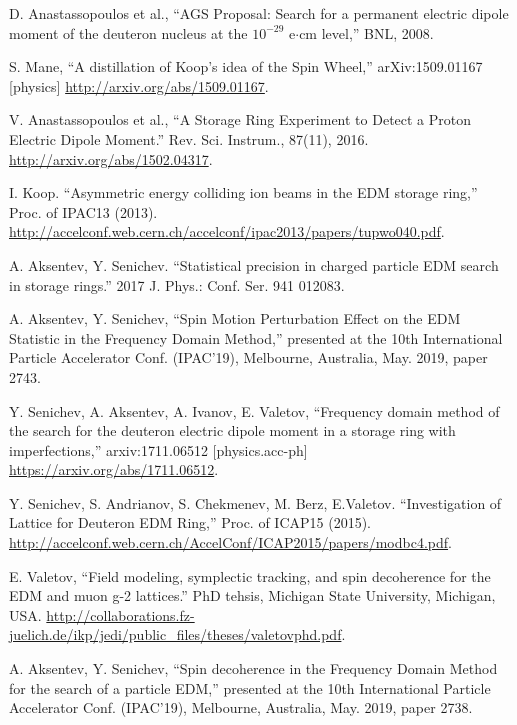 \documentclass[a4paper]{jacow}
\begin{document}
\begin{thebibliography}{9}
  
  D. Anastassopoulos et al., ``AGS Proposal: Search for a permanent electric dipole moment of
  the deuteron nucleus at the $10^{-29}$ e$\cdot$cm level,'' BNL, 2008.

  S. Mane, ``A distillation of Koop's idea of the Spin Wheel,'' arXiv:1509.01167 [physics]
  \url{http://arxiv.org/abs/1509.01167}.

  V. Anastassopoulos et al., ``A Storage Ring Experiment to Detect a Proton Electric Dipole Moment.''
  Rev. Sci. Instrum., 87(11), 2016.
  \url{http://arxiv.org/abs/1502.04317}.

  I. Koop. ``Asymmetric energy colliding ion beams in the EDM storage ring,'' Proc. of IPAC13 (2013).
  \url{http://accelconf.web.cern.ch/accelconf/ipac2013/papers/tupwo040.pdf}.

  A. Aksentev, Y. Senichev. ``Statistical precision in charged particle EDM search in storage rings.''
  2017 J. Phys.: Conf. Ser. 941 012083.

  A. Aksentev, Y. Senichev, ``Spin Motion Perturbation Effect on the EDM Statistic
  in the Frequency Domain Method,'' presented at the 10th International Particle Accelerator Conf. (IPAC'19),
  Melbourne, Australia, May. 2019, paper 2743.

  Y. Senichev, A. Aksentev, A. Ivanov, E. Valetov, ``Frequency domain method of the search for
  the deuteron electric dipole moment in a storage ring with imperfections,'' arxiv:1711.06512 [physics.acc-ph]
  \url{https://arxiv.org/abs/1711.06512}.

  Y. Senichev, S. Andrianov, S. Chekmenev, M. Berz, E.Valetov. ``Investigation of Lattice for Deuteron EDM Ring,''
  Proc. of ICAP15 (2015). \url{http://accelconf.web.cern.ch/AccelConf/ICAP2015/papers/modbc4.pdf}.

  E. Valetov, ``Field modeling, symplectic tracking, and spin decoherence for the EDM and muon g-2 lattices.''
  PhD tehsis, Michigan State University, Michigan, USA.
  \url{http://collaborations.fz-juelich.de/ikp/jedi/public_files/theses/valetovphd.pdf}.

  A. Aksentev, Y. Senichev, ``Spin decoherence in the Frequency Domain Method for the search of a particle EDM,''
  presented at the 10th International Particle Accelerator Conf. (IPAC'19), Melbourne, Australia,
  May. 2019, paper 2738.


\end{thebibliography}
\end{document}
